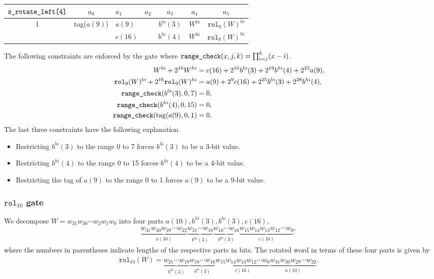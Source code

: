 \documentclass[10pt]{article}
\begin{document}
\begin{center}
  \begin{tabular}{c|c|l|l|c|c|c}
    $\texttt{s\textunderscore rotate\textunderscore left[4]}$ & $a_0$ & $a_1$ & $a_2$ & $a_3$ & $a_4$ & $a_5$ \\ \hline
    1  & tag($a(9)$) & $a(9)$ &                        & $b^{lo}(3)$ & $W^{lo}$  & $\texttt{rol}_9(W)^{lo}$  \\ 
       &              & $c(16)$ &                        & $b^{hi}(4)$ & $W^{hi}$  & $\texttt{rol}_9(W)^{hi}$  \\ \hline
  \end{tabular}
\end{center}

The following constraints are enforced by the gate where $\texttt{range\textunderscore check}(x, j, k) = \prod_{i=j}^k (x-i)$.
\begin{align*}
  W^{lo} + 2^{16} W^{hi} & = c(16) + 2^{16} b^{lo}(3) + 2^{19} b^{hi}(4) + 2^{23} a(9),\\
  \texttt{rol}_9(W)^{lo} + 2^{16} \texttt{rol}_9(W)^{hi} & = a(9) + 2^9 c(16) + 2^{25} b^{lo}(3) + 2^{28} b^{hi}(4),\\
  \texttt{range\textunderscore check}(b^{lo}(3), 0, 7) & = 0,\\
  \texttt{range\textunderscore check}(b^{hi}(4), 0, 15) & = 0,\\
  \texttt{range\textunderscore check}(\text{tag}(a(9), 0, 1) & = 0.
\end{align*}
The last three constraints have the following explanation.
\begin{itemize}
\item Restricting $b^{lo}(3)$ to the range 0 to 7 forces $b^{lo}(3)$ to be a 3-bit value.
\item Restricting $b^{hi}(4)$ to the range 0 to 15 forces $b^{hi}(4)$ to be a 4-bit value.
\item Restricting the tag of $a(9)$ to the range 0 to 1 forces $a(9)$ to be a 9-bit value.
\end{itemize}

\subsubsection{$\texttt{rol}_{10}$ gate}%
\label{sec:rol_10_gate}
We decompose $W = w_{31}w_{30}\cdots w_2w_1w_0$ into four parts $a(10), b^{hi}(3), b^{lo}(3), c(16)$,
\begin{align*}
  \underbrace{w_{31}w_{30}w_{29}\cdots w_{22}}_{a(10)} \underbrace{w_{21}\cdots w_{19}}_{b^{hi}(3)}
  \underbrace{w_{18}\cdots w_{16}}_{b^{lo}(3)} \underbrace{w_{15}w_{14}w_{13}w_{12}\cdots w_{0}}_{c(16)},
\end{align*}
where the numbers in parentheses indicate lengths of the respective parts in bits. The rotated word in terms of these four parts is given by
\begin{align*}
  \texttt{rol}_{10}(W) = 
  \underbrace{w_{21}\cdots w_{19}}_{b^{hi}(3)} \underbrace{w_{18}\cdots w_{16}}_{b^{lo}(3)}
  \underbrace{w_{15}w_{14}w_{13}w_{12}\cdots w_{0}}_{c(16)}\underbrace{w_{31}w_{30}w_{29}\cdots w_{22}}_{a(10)}.
\end{align*}
\end{document}
